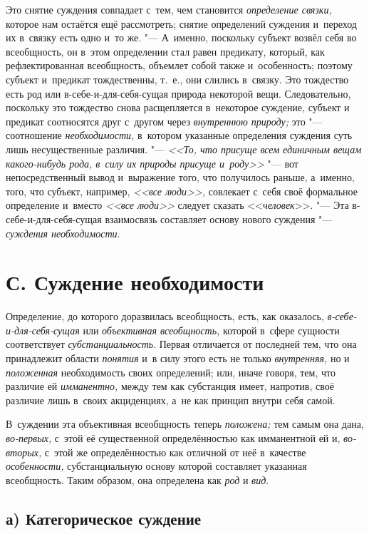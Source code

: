 Это снятие суждения совпадает с~тем, чем становится {\em определение связки,}
которое нам остаётся ещё рассмотреть; снятие определений суждения и~переход их
в~связку есть одно и~то же. "--- А~именно, поскольку субъект возвёл себя во
всеобщность, он в~этом определении стал равен предикату, который, как
рефлектированная всеобщность, объемлет собой также и~особенность; поэтому
субъект и~предикат тождественны, т.~е., они слились в~связку. Это тождество
есть род или в-себе-и-для-себя-сущая природа некоторой вещи. Следовательно,
поскольку это тождество снова расщепляется в~некоторое суждение, субъект и
предикат соотносятся друг с~другом через {\em внутреннюю природу;} это "---
соотношение {\em необходимости,} в~котором указанные определения суждения суть
лишь несущественные различия. "--- {\em <<То, что присуще всем единичным вещам
какого-нибудь рода, в~силу их природы присуще и~роду>>} "--- вот
непосредственный вывод и~выражение того, что получилось раньше, а~именно, того,
что субъект, например, {\em <<все люди>>,} совлекает с~себя своё формальное
определение и~вместо {\em <<все люди>>} следует сказать <<{\em человек}>>. "---
Эта в-себе-и-для-себя-сущая взаимосвязь составляет основу нового суждения "---
{\em суждения необходимости}.

\section[С. Суждение необходимости]{С. Суждение необходимости}

Определение, до которого доразвилась всеобщность, есть, как
оказалось, {\em в-себе-и-для-себя-сущая} или {\em объективная
всеобщность,} которой в~сфере сущности соответствует {\em субстанциальность}.
Первая отличается от последней тем, что она принадлежит
области {\em понятия} и~в силу этого есть не только {\em внутренняя,} но и
{\em положенная} необходимость своих определений; или, иначе говоря, тем, что
различие ей {\em имманентно,}
между тем как субстанция имеет, напротив, своё различие лишь
в~своих акциденциях, а~не как принцип внутри себя самой.

В~суждении эта объективная всеобщность теперь {\em положена;} тем самым
она дана, {\em во-первых,} с~этой её существенной определённостью как
имманентной ей и, {\em во-вторых,} с~этой
же определённостью как отличной от неё в~качестве {\em особенности,}
субстанциальную основу которой составляет указанная
всеобщность. Таким образом, она определена как {\em род} и {\em вид}.

\subsection[а) Категорическое суждение]{а) Категорическое суждение}

